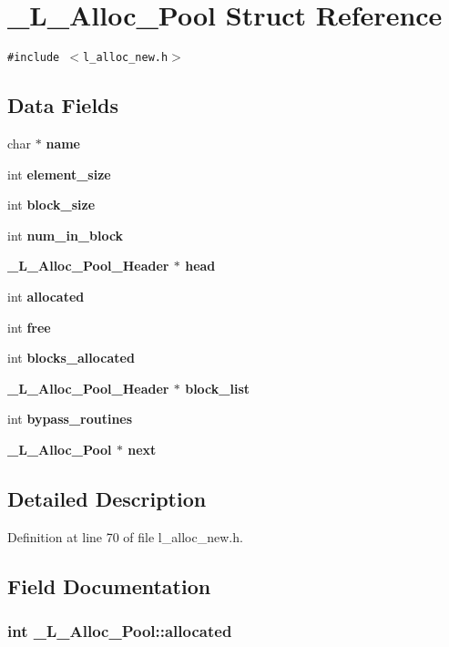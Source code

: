 \section{\_\-L\_\-Alloc\_\-Pool Struct Reference}
\label{struct__L__Alloc__Pool}
{\tt \#include $<$l\_\-alloc\_\-new.h$>$}

\subsection*{Data Fields}
\begin{CompactItemize}
\item 
char $\ast$ \bf{name}
\item 
int \bf{element\_\-size}
\item 
int \bf{block\_\-size}
\item 
int \bf{num\_\-in\_\-block}
\item 
\bf{\_\-L\_\-Alloc\_\-Pool\_\-Header} $\ast$ \bf{head}
\item 
int \bf{allocated}
\item 
int \bf{free}
\item 
int \bf{blocks\_\-allocated}
\item 
\bf{\_\-L\_\-Alloc\_\-Pool\_\-Header} $\ast$ \bf{block\_\-list}
\item 
int \bf{bypass\_\-routines}
\item 
\bf{\_\-L\_\-Alloc\_\-Pool} $\ast$ \bf{next}
\end{CompactItemize}


\subsection{Detailed Description}




Definition at line 70 of file l\_\-alloc\_\-new.h.

\subsection{Field Documentation}
\subsubsection{\setlength{\rightskip}{0pt plus 5cm}int \bf{\_\-L\_\-Alloc\_\-Pool::allocated}}\label{struct__L__Alloc__Pool_e4f5972e3210bb2cf1f7d63371a64e9e}




